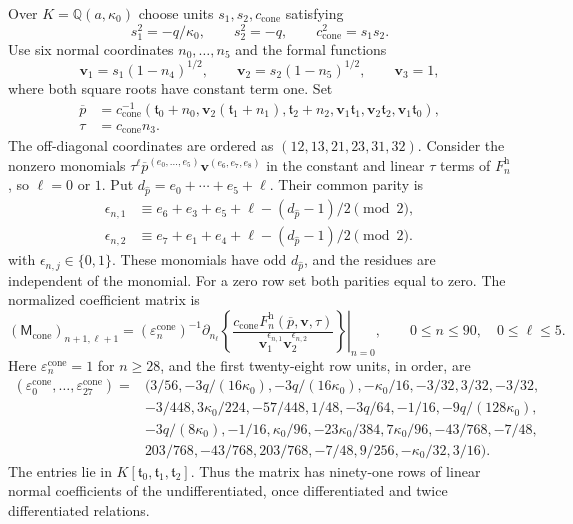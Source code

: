 \documentclass[11pt,a4paper]{article}
\numberwithin{equation}{section}
\theoremstyle{plain}
\theoremstyle{definition}
\theoremstyle{remark}
\begin{document}
Over $K=\mathbb Q(a,\kappa_0)$ choose units $s_1,s_2,c_{\mathrm{cone}}$ satisfying
\[
 s_1^2=-q/\kappa_0,\qquad s_2^2=-q,\qquad c_{\mathrm{cone}}^2=s_1s_2.
\]
Use six normal coordinates $n_0,\ldots,n_5$ and the formal functions
\[
 \boldsymbol v_1=s_1(1-n_4)^{1/2},\qquad
 \boldsymbol v_2=s_2(1-n_5)^{1/2},\qquad \boldsymbol v_3=1,
\]
where both square roots have constant term one. Set
\[
 \begin{aligned}
 \overline p&=c_{\mathrm{cone}}^{-1}(\mathfrak t_0+n_0,
       \boldsymbol v_2(\mathfrak t_1+n_1),\mathfrak t_2+n_2,
       \boldsymbol v_1\mathfrak t_1,\boldsymbol v_2\mathfrak t_2,\boldsymbol v_1\mathfrak t_0),\\
 \tau&=c_{\mathrm{cone}}n_3.
 \end{aligned}
\]
The off-diagonal coordinates are ordered as
$(12,13,21,23,31,32)$. Consider the nonzero monomials
$\tau^\ell\overline p^{(e_0,\ldots,e_5)}\boldsymbol v^{(e_6,e_7,e_8)}$
in the constant and linear $\tau$ terms of $F_n^{\mathrm h}$, so
$\ell=0$ or $1$. Put $d_{\widehat p}=e_0+\cdots+e_5+\ell$. Their common parity is
\[
 \begin{aligned}
 \epsilon_{n,1}&\equiv e_6+e_3+e_5+\ell-(d_{\widehat p}-1)/2\pmod2,\\
 \epsilon_{n,2}&\equiv e_7+e_1+e_4+\ell-(d_{\widehat p}-1)/2\pmod2.
 \end{aligned}
\]
with $\epsilon_{n,j}\in\{0,1\}$. These monomials have odd $d_{\widehat p}$,
and the residues are independent of the monomial. For a zero row
set both parities equal to zero.
The normalized coefficient matrix is
\[
 (\mathsf M_{\mathrm{cone}})_{n+1,\ell+1}
 =(\varepsilon_n^{\mathrm{cone}})^{-1}\left.
 \partial_{n_\ell}
 \left\{\frac{c_{\mathrm{cone}}F_n^{\mathrm h}(\overline p,\boldsymbol v,\tau)}
 {\boldsymbol v_1^{\epsilon_{n,1}}\boldsymbol v_2^{\epsilon_{n,2}}}\right\}\right|_{n=0},
 \qquad 0\le n\le90,\quad0\le\ell\le5.
\]
Here $\varepsilon_n^{\mathrm{cone}}=1$ for $n\ge28$, and the first twenty-eight row units,
in order, are
\[
\begin{aligned}
(\varepsilon_0^{\mathrm{cone}},\ldots,\varepsilon_{27}^{\mathrm{cone}})={}&(
3/56,-3q/(16\kappa_0),-3q/(16\kappa_0),-\kappa_0/16,
-3/32,3/32,-3/32,\\
&-3/448,3\kappa_0/224,-57/448,1/48,-3q/64,-1/16,
-9q/(128\kappa_0),\\
&-3q/(8\kappa_0),-1/16,\kappa_0/96,-23\kappa_0/384,
7\kappa_0/96,-43/768,-7/48,\\
&203/768,-43/768,203/768,-7/48,9/256,-\kappa_0/32,3/16).
\end{aligned}
\]
The entries lie in $K[\mathfrak t_0,\mathfrak t_1,\mathfrak t_2]$.
Thus the matrix has ninety-one rows of linear normal coefficients of
the undifferentiated, once differentiated and twice differentiated relations.
\end{document}
